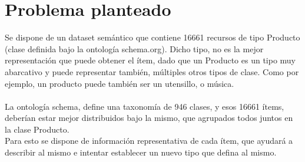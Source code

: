 \section{Problema planteado}

Se dispone de un dataset semántico que contiene 16661 recursos de tipo Producto (clase definida bajo la ontología schema.org). 
Dicho tipo, no es la mejor representación que puede obtener el ítem, dado que un Producto es un tipo muy abarcativo y puede representar 
también, múltiples otros tipos de clase. Como por ejemplo, un producto puede también ser un utensillo, o música. \\
\\
La ontología schema, define una taxonomía de 946 clases, y esos 16661 ítems, deberían estar mejor distribuidos bajo la mismo, que agrupados 
todos juntos en la clase Producto. \\
Para esto se dispone de información representativa de cada ítem, que ayudará a describir al mismo e intentar establecer un nuevo tipo que 
defina al mismo.